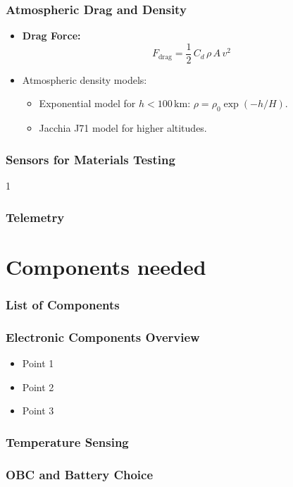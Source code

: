 \documentclass{beamer}
\begin{document}
\begin{frame}
    \frametitle{Atmospheric Drag and Density}
    \begin{itemize}
        \item \textbf{Drag Force:}
        \[
        F_{\text{drag}} = \frac{1}{2} \, C_d \, \rho \, A \, v^2
        \]
        \item Atmospheric density models:
        \begin{itemize}
            \item Exponential model for \( h < 100 \, \mathrm{km}: \, \rho = \rho_0 \exp(-h / H) \).
            \item Jacchia J71 model for higher altitudes.
        \end{itemize}
    \end{itemize}
\end{frame}



\begin{frame}
    \frametitle{Sensors for Materials Testing}
    \item 1
\end{frame}


\begin{frame}
    \frametitle{Telemetry}
\end{frame}



\section{Components needed}

\begin{frame}
    \frametitle{List of Components}
\end{frame}

\begin{frame}
    \frametitle{Electronic Components Overview}
    \begin{itemize}
        \item Point 1
        \item Point 2
        \item Point 3
    \end{itemize}
\end{frame}

\begin{frame}
    \frametitle{Temperature Sensing}
\end{frame}

\begin{frame}
    \frametitle{OBC and Battery Choice}
\end{frame}
\end{document}
